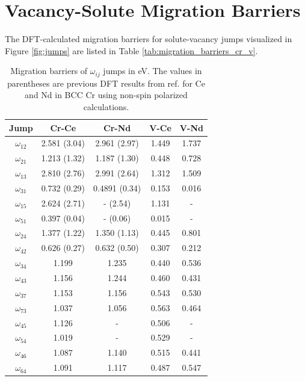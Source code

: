 \documentclass[preprint,12pt]{elsarticle}
\begin{document}
\appendix
\setcounter{table}{0}

\section{Vacancy-Solute Migration Barriers}
\label{appendix:migration_barriers}
The DFT-calculated migration barriers for solute-vacancy jumps visualized in Figure \ref{fig:jumps} are listed in Table \ref{tab:migration_barriers_cr_v}.

\begin{table}[]
    \centering
    \caption{Migration barriers of $\omega_{ij}$ jumps in eV. The values in parentheses are previous DFT results from ref. \cite{yang_significant_2023} for Ce and Nd in BCC Cr using non-spin polarized calculations.}
    \begin{tabular}{|c|c|c|c|c|}
    \hline
      Jump &Cr-Ce &Cr-Nd &V-Ce  &V-Nd  \\
      \hline
       $\omega_{12}$  &2.581 (3.04) &2.961 (2.97)&1.449 &1.737 \\
       $\omega_{21}$  &1.213 (1.32) &1.187 (1.30) &0.448 &0.728 \\
       \hline
       $\omega_{13}$  &2.810 (2.76) &2.991 (2.64)&1.312 &1.509 \\
       $\omega_{31}$  &0.732 (0.29) &0.4891 (0.34)&0.153 &0.016 \\
       \hline
       $\omega_{15}$  &2.624 (2.71)&-  (2.54)&1.131 &- \\ 
       $\omega_{51}$  &0.397 (0.04)&-  (0.06)&0.015 &- \\
       \hline
       $\omega_{24}$  &1.377 (1.22)&1.350 (1.13)&0.445 &0.801 \\ 
       $\omega_{42}$  &0.626 (0.27)&0.632 (0.50)&0.307 &0.212 \\
       \hline
       $\omega_{34}$  &1.199 &1.235 &0.440 &0.536 \\ 
       $\omega_{43}$  &1.156 &1.244 &0.460 &0.431 \\
       \hline
       $\omega_{37}$ &1.153 &1.156 &0.543 &0.530 \\ 
       $\omega_{73}$  &1.037 &1.056 &0.563 &0.464 \\
       \hline
       $\omega_{45}$ &1.126 &- &0.506 &- \\ 
       $\omega_{54}$ &1.019 &- &0.529 &- \\
       \hline
       $\omega_{46}$ &1.087 &1.140 &0.515 &0.441 \\ 
       $\omega_{64}$ &1.091 &1.117 &0.487 &0.547 \\

\end{tabular}
\end{table}
\end{document}
